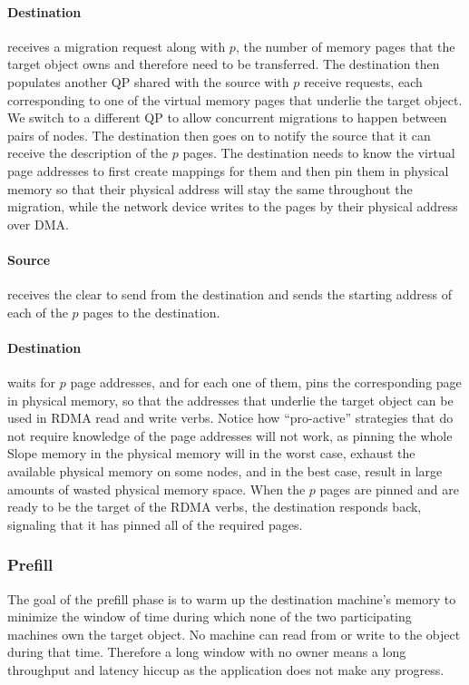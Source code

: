 \paragraph{Destination}
receives a migration request along with $p$, the number of memory pages that the
target object owns and therefore need to
be transferred. The destination then populates another QP shared with the source
with $p$ receive requests, each corresponding to one of the virtual memory pages
that underlie the target object. We switch to a different QP
to allow concurrent migrations to happen between pairs of nodes. The destination
then goes on to notify the source that it can receive the description of the $p$
pages. The destination needs to know the virtual page addresses
to first create mappings for them and then pin them in physical memory so that their
physical address will stay the same throughout the migration, while the network
device writes to the pages by their physical address over DMA.

\paragraph{Source} receives the clear to send from the destination and sends the starting address
of each of the $p$ pages to the destination. 

\paragraph{Destination} waits for $p$ page addresses, and for each one of them, pins the
corresponding page in physical memory, so that the addresses that underlie the
target object can be used in RDMA read and write verbs. Notice how
``pro-active'' strategies that do not require knowledge of the page addresses
will not work, as pinning the
whole Slope memory in the physical memory will in the worst case, exhaust the
available physical memory on some nodes, and in the best case, result in large
amounts of wasted physical memory space. When the $p$ pages are pinned
and are ready to be the target of the RDMA verbs, the destination responds back,
signaling that it has pinned all of the required pages.

\subsubsection{Prefill}
The goal of the prefill phase is to warm up the destination machine's memory to
minimize the window of time during which none of the two participating machines
own the target object. No machine can read from or write to the object during
that time. Therefore a long window with no owner means a long throughput
and latency hiccup as the application does not make any progress.

